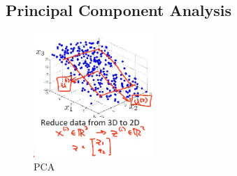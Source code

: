 \documentclass[12pt,a4paper]{article}
\begin{document}
\newpage

\subsection{Principal Component Analysis}
\begin{figure}[htb]
\center
\includegraphics[width=0.4\textwidth]{pca}
\caption{PCA}
\end{figure}
\end{document}
